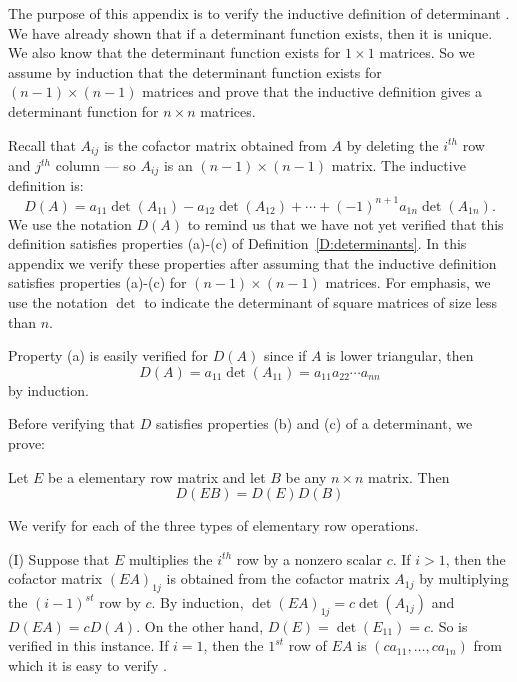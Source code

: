 \documentclass{ximera}
\begin{document}
\label{A:det}

The purpose of this appendix is to verify the inductive
definition of determinant . We have already
shown that if a determinant function exists, then it is unique.
We also know that the determinant function exists for $1\times
1$ matrices. So we assume by induction that the determinant function
exists for $(n-1)\times(n-1)$ matrices and prove that the
inductive definition gives a determinant function for $n\times
n$ matrices.  

Recall that $A_{ij}$ is the cofactor matrix obtained from $A$ by
deleting the $i^{th}$ row and $j^{th}$ column --- so $A_{ij}$ is
an $(n-1)\times(n-1)$ matrix.  The inductive definition is:
\[
D(A) = a_{11}\det(A_{11})-a_{12}\det(A_{12})+\cdots 
+(-1)^{n+1}a_{1n}\det(A_{1n}).
\] 
We use the notation $D(A)$ to remind us that we have not yet
verified that this definition satisfies properties (a)-(c) of
Definition~\ref{D:determinants}.  In this appendix we verify these
properties after assuming that the inductive definition
satisfies properties (a)-(c) for $(n-1)\times (n-1)$ matrices.
For emphasis, we use the notation $\det$ to indicate the
determinant of square matrices of size less than $n$.

Property (a) is easily verified for $D(A)$ since if $A$ is lower
triangular, then
\[
D(A) = a_{11}\det(A_{11}) = a_{11}a_{22}\cdots a_{nn}
\]
by induction.

Before verifying that $D$ satisfies properties (b) and (c) of a
determinant, we prove:
\begin{lemma}
Let $E$ be a elementary row matrix and let $B$ be any $n\times
n$ matrix.   Then
\begin{equation} \label{e:proddetE}
D(EB) = D(E) D(B)
\end{equation} 
\end{lemma}

\proof We verify  for each of the three types of
elementary row operations. 

\noindent (I) Suppose that $E$ multiplies the $i^{th}$ row by a
nonzero scalar $c$.  If $i>1$, then the cofactor matrix
$(EA)_{1j}$ is obtained from the cofactor matrix $A_{1j}$ by
multiplying the $(i-1)^{st}$ row by $c$.  By induction,
$\det(EA)_{1j}= c\det(A_{1j})$ and $D(EA)=cD(A)$.  On the other
hand, $D(E)=\det(E_{11})=c$.  So  is verified in
this instance.  If $i=1$, then the $1^{st}$ row of $EA$ is
$(ca_{11},\ldots,ca_{1n})$ from which it is easy to verify
.
\end{document}

